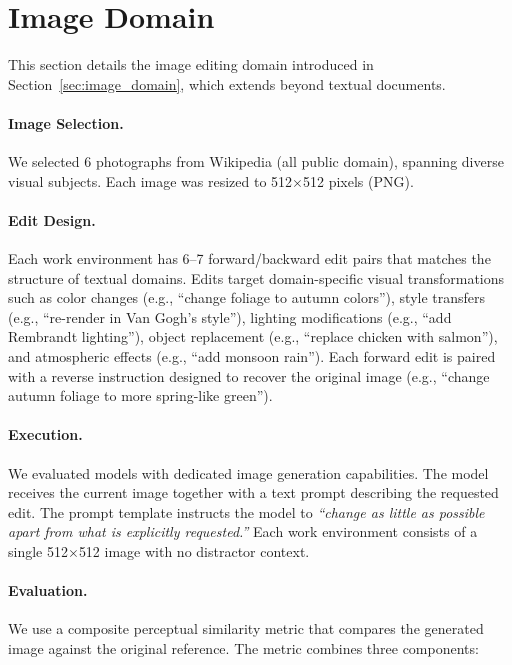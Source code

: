 \documentclass{article} %
\begin{document}
\section{Image Domain} \label{app:image_domain}

This section details the image editing domain introduced in Section~\ref{sec:image_domain}, which extends \benchmark{} beyond textual documents.

\paragraph{Image Selection.} We selected 6 photographs from Wikipedia (all public domain), spanning diverse visual subjects. Each image was resized to 512$\times$512 pixels (PNG).

\paragraph{Edit Design.} Each work environment has 6--7 forward/backward edit pairs that matches the structure of textual domains. Edits target domain-specific visual transformations such as color changes (e.g., ``change foliage to autumn colors''), style transfers (e.g., ``re-render in Van Gogh's style''), lighting modifications (e.g., ``add Rembrandt lighting''), object replacement (e.g., ``replace chicken with salmon''), and atmospheric effects (e.g., ``add monsoon rain''). Each forward edit is paired with a reverse instruction designed to recover the original image (e.g., ``change autumn foliage to more spring-like green'').

\paragraph{Execution.} We evaluated models with dedicated image generation capabilities. The model receives the current image together with a text prompt describing the requested edit. The prompt template instructs the model to \textit{``change as little as possible apart from what is explicitly requested.''} Each work environment consists of a single 512$\times$512 image with no distractor context.

\paragraph{Evaluation.} We use a composite perceptual similarity metric that compares the generated image against the original reference. The metric combines three components:
\end{document}
